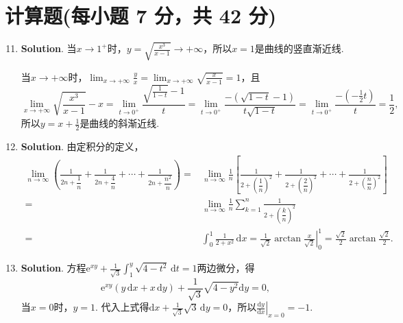 \documentclass[../main.tex]{subfiles}
\begin{document}
\section{计算题(每小题 7 分，共 42 分)}
\begin{enumerate}
    \setcounter{enumi}{10}
    \item \textbf{Solution}. 当$x\to 1^{+}$时，$y=\sqrt{\frac{x^{3}}{x-1}}\to
              +\infty$，所以$x=1$是曲线的竖直渐近线.

          当$x\to +\infty$时，$\lim_{x\to +\infty}\frac{y}{x}=\lim_{x\to +\infty}\sqrt{\frac{x}{x-1}}
              =1$，且
          \[
              \lim_{x\to +\infty}\sqrt{\frac{x^{3}}{x-1}}-x=\lim_{t\to 0^+}\frac{\sqrt{\frac{1}{1-t}}-1}{t}
              =\lim_{t\to 0^+}\frac{-\left(\sqrt{1-t}-1\right)}{t\sqrt{1-t}}=\lim_{t\to
                  0^+}\frac{-\left(-\frac{1}{2}t\right)}{t}=\frac{1}{2},
          \]
          所以$y=x+\frac{1}{2}$是曲线的斜渐近线.

    \item \textbf{Solution}. 由定积分的定义，
          \[
              \begin{aligned}
                  \lim_{n\to\infty}\left(\frac{1}{2n+\dfrac{1}{n}}+\frac{1}{2n+\dfrac{4}{n}}+\cdots+\frac{1}{2n+\dfrac{n^2}{n}}\right) = {} & \lim_{n\to\infty}\frac{1}{n}\left[\frac{1}{2+\left(\dfrac{1}{n}\right)^2}+\frac{1}{2+\left(\dfrac{2}{n}\right)^2}+\cdots+\frac{1}{2+\left(\dfrac{n}{n}\right)^2}\right] \\
                  = {}                                                                                                                      & \lim_{n\to\infty}\frac{1}{n}\sum_{k=1}^{n}\frac{1}{2+\left(\dfrac{k}{n}\right)^2}                                                                                       \\
                  = {}                                                                                                                      & \int_{0}^{1}\frac{1}{2+x^2}\,\mathrm{d}x = \left.\frac{1}{\sqrt{2}}\arctan\frac{x}{\sqrt{2}}\right|_{0}^{1}= \frac{\sqrt{2}}{2}\arctan\frac{\sqrt{2}}{2}.
              \end{aligned}
          \]

    \item \textbf{Solution}. 方程$\mathrm{e}^{xy}+\frac{1}{\sqrt{3}}\int_{1}
              ^{y}\sqrt{4-t^{2}}\,\mathrm{d}t=1$两边微分，得
          \[
              \mathrm{e}^{xy}(y\,\mathrm{d}x+x\,\mathrm{d}y)+\frac{1}{\sqrt{3}}\sqrt{4-y^{2}}
              \mathrm{d}y=0,
          \]
          当$x=0$时，$y=1$. 代入上式得$\mathrm{d}x+\frac{1}{\sqrt{3}}\sqrt{3}\,\mathrm{d}
              y=0$，所以$\left.\frac{\mathrm{d}y}{\mathrm{d}x}\right|_{x=0}=-1$.


\end{enumerate}
\end{document}
